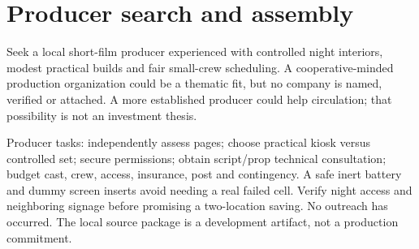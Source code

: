 \section{Producer search and assembly}
Seek a local short-film producer experienced with controlled night interiors, modest practical builds and fair small-crew scheduling. A cooperative-minded production organization could be a thematic fit, but no company is named, verified or attached. A more established producer could help circulation; that possibility is not an investment thesis.

Producer tasks: independently assess pages; choose practical kiosk versus controlled set; secure permissions; obtain script/prop technical consultation; budget cast, crew, access, insurance, post and contingency. A safe inert battery and dummy screen inserts avoid needing a real failed cell. Verify night access and neighboring signage before promising a two-location saving. No outreach has occurred. The local source package is a development artifact, not a production commitment.
